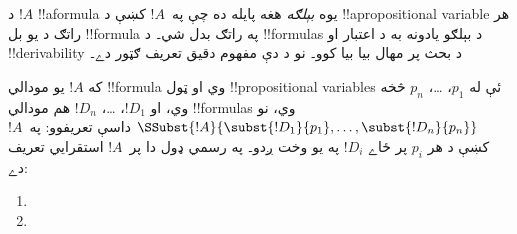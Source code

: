 \documentclass[../../../include/open-logic-section]{subfiles}
\begin{document}


د $!A$ !!a{formula} يوه \emph{بېلګه} هغه پايله ده چې په~$!A$ کښې د
!!a{propositional variable} هر راتګ د يو بل !!{formula} په راتګ بدل
شي۔ د !!{formula}s د بېلګو يادونه به د اعتبار او !!{derivability} د
بحث پر مهال بيا بيا کوو۔ نو د دې مفهوم دقيق تعريف ګټور دے۔

\begin{defn}
  که $!A$ يو مودالي !!{formula} وي او ټول !!{propositional
    variable}s ئې له $p_1$، \dots، $p_n$ څخه وي، او $!D_1$، \dots،
  $!D_n$ هم مودالي !!{formula}s وي، نو
  $\SSubst{!A}{\subst{!D_1}{p_1}, \dots, \subst{!D_n}{p_n}}$ داسې
  تعريفوو: په~$!A$ کښې د هر $p_i$ پر ځاے $!D_i$ په يو وخت ږدو۔ په
  رسمي ډول دا پر~$!A$ استقرايي تعريف دے:
  \begin{enumerate}
    \item {}
    \item {}

\end{enumerate}
\end{defn}
\end{document}

